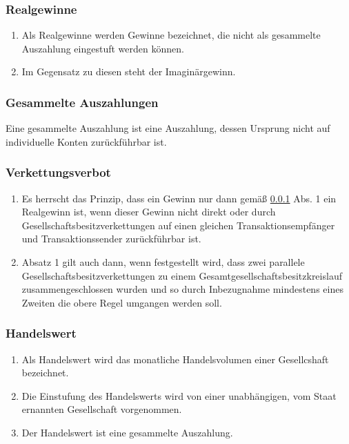 \documentclass{article}
\begin{document}
\subsubsection{Realgewinne}\label{real}
\begin{enumerate}[(1)]
    \item Als Realgewinne werden Gewinne bezeichnet, die nicht als gesammelte Auszahlung eingestuft werden können.
    \item Im Gegensatz zu diesen steht der Imaginärgewinn.
\end{enumerate}

\subsubsection{Gesammelte Auszahlungen}
Eine gesammelte Auszahlung ist eine Auszahlung, dessen Ursprung nicht auf individuelle Konten zurückführbar ist.

\subsubsection{Verkettungsverbot}
\begin{enumerate}[(1)]
    \item Es herrscht das Prinzip, dass ein Gewinn nur dann gemäß \ref{real} Abs. 1 ein Realgewinn ist, wenn dieser Gewinn nicht direkt oder durch Gesellschaftsbesitzverkettungen auf einen gleichen Transaktionsempfänger und Transaktionssender zurückführbar ist.
    \item Absatz 1 gilt auch dann, wenn festgestellt wird, dass zwei parallele Gesellschaftsbesitzverkettungen zu einem Gesamtgesellschaftsbesitzkreislauf zusammengeschlossen wurden und so durch Inbezugnahme mindestens eines Zweiten die obere Regel umgangen werden soll.
\end{enumerate}

\subsubsection{Handelswert}
\begin{enumerate}[(1)]
    \item Als Handelswert wird das monatliche Handelsvolumen einer Gesellcshaft bezeichnet.
    \item Die Einstufung des Handelswerts wird von einer unabhängigen, vom Staat ernannten Gesellschaft vorgenommen.
    \item Der Handelswert ist eine gesammelte Auszahlung.
\end{enumerate}
\end{document}
